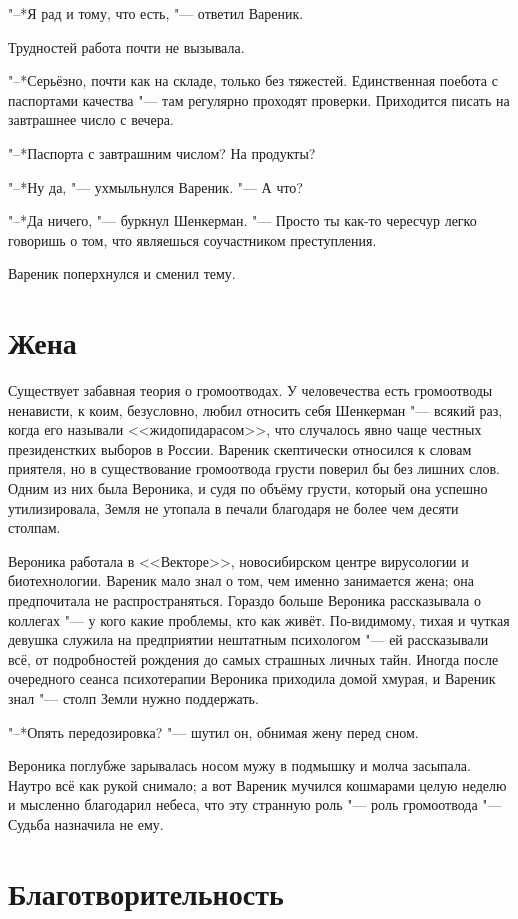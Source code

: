 "--*Я рад и тому, что есть, "--- ответил Вареник.

Трудностей работа почти не вызывала.

"--*Серьёзно, почти как на складе, только без тяжестей.
Единственная поебота с паспортами качества "--- там регулярно проходят проверки.
Приходится писать на завтрашнее число с вечера.

"--*Паспорта с завтрашним числом?
На продукты?

"--*Ну да, "--- ухмыльнулся Вареник.
"--- А что?

"--*Да ничего, "--- буркнул Шенкерман.
"--- Просто ты как-то чересчур легко говоришь о том, что являешься соучастником преступления.

Вареник поперхнулся и сменил тему.

\section{Жена}

Существует забавная теория о громоотводах.
У человечества есть громоотводы ненависти, к коим, безусловно, любил относить себя Шенкерман "--- всякий раз, когда его называли <<жидопидарасом>>, что случалось явно чаще честных президенстких выборов в России.
Вареник скептически относился к словам приятеля, но в существование громоотвода грусти поверил бы без лишних слов.
Одним из них была Вероника, и судя по объёму грусти, который она успешно утилизировала, Земля не утопала в печали благодаря не более чем десяти столпам.

Вероника работала в <<Векторе>>, новосибирском центре вирусологии и биотехнологии.
Вареник мало знал о том, чем именно занимается жена;
она предпочитала не распространяться.
Гораздо больше Вероника рассказывала о коллегах "--- у кого какие проблемы, кто как живёт.
По-видимому, тихая и чуткая девушка служила на предприятии нештатным психологом "--- ей рассказывали всё, от подробностей рождения до самых страшных личных тайн.
Иногда после очередного сеанса психотерапии Вероника приходила домой хмурая, и Вареник знал "--- столп Земли нужно поддержать.

"--*Опять передозировка? "--- шутил он, обнимая жену перед сном.

Вероника поглубже зарывалась носом мужу в подмышку и молча засыпала.
Наутро всё как рукой снимало;
а вот Вареник мучился кошмарами целую неделю и мысленно благодарил небеса, что эту странную роль "--- роль громоотвода "--- Судьба назначила не ему.

\section{Благотворительность}

